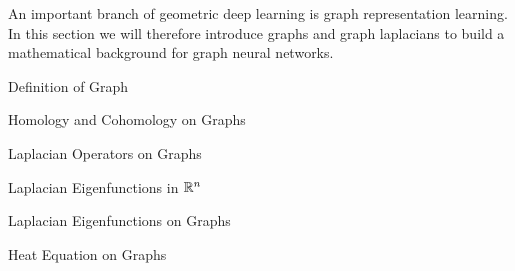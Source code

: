\documentclass[../main.tex]{subfiles}
\begin{document}
    An important branch of geometric deep learning is graph representation learning. In this section we will therefore
    introduce graphs and graph laplacians to build a mathematical background for graph neural networks. 
    \begin{section}{Definition of Graph}
           
    \end{section}
    \begin{section}{Homology and Cohomology on Graphs}
        
    \end{section}
    \begin{section}{Laplacian Operators on Graphs}
        
        \label{sec:2:3}
    \end{section}
    \begin{section}{Laplacian Eigenfunctions in $\mathbb{R}^n$}
        
    \end{section}
    \begin{section}{Laplacian Eigenfunctions on Graphs}
        
    \end{section}
    \begin{section}{Heat Equation on Graphs}
        
    \end{section}
\end{document}
